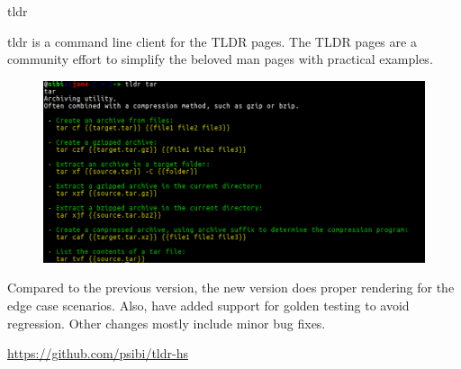 \documentclass[DIV16,twocolumn,10pt]{scrreprt}
\begin{document}
\begin{hcarentry}{tldr}
\makeheader

tldr is a command line client for the TLDR pages. The TLDR pages are a
community effort to simplify the beloved man pages with practical
examples.

\begin{figure}[h!]
  \includegraphics[width=\linewidth]{tldr.png}
  \label{fig:tldr-client}
\end{figure}

Compared to the previous version, the new version does proper
rendering for the edge case scenarios. Also, have added support for
golden testing to avoid regression. Other changes mostly include minor
bug fixes.

\FurtherReading
  \url{https://github.com/psibi/tldr-hs}
\end{hcarentry}
\end{document}
